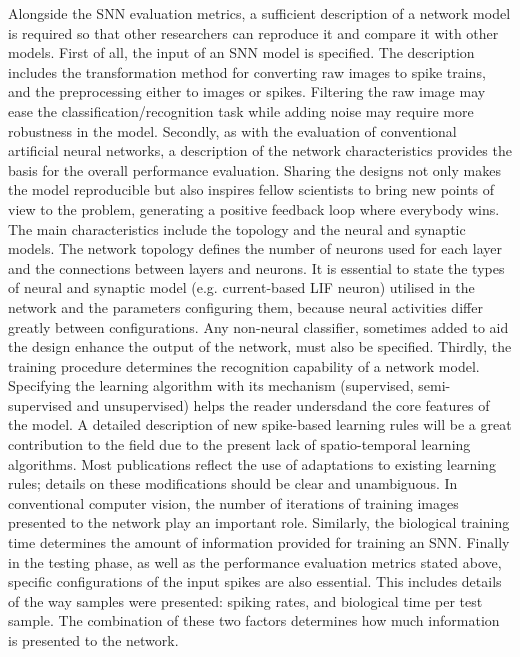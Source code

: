 Alongside the SNN evaluation metrics, a sufficient description of a network model is required so that other researchers can reproduce it and compare it with other models.
First of all, the input of an SNN model is specified.
The description includes the transformation method for converting raw images to spike trains, and the preprocessing either to images or spikes.
Filtering the raw image may ease the classification/recognition task while adding noise may require more robustness in the model.
Secondly, as with the evaluation of conventional artificial neural networks, a description of the network characteristics provides the basis for the overall performance evaluation.
Sharing the designs not only makes the model reproducible but also inspires fellow scientists to bring new points of view to the problem, generating a positive feedback loop where everybody wins.
The main characteristics include the topology and the neural and synaptic models.
The network topology defines the number of neurons used for each layer and the connections between layers and neurons.
It is essential to state the types of neural and synaptic model (e.g. current-based LIF neuron) utilised in the network and the parameters configuring them, because neural activities differ greatly between configurations.
Any non-neural classifier, sometimes added to aid the design enhance the output of the network, must also be specified.
Thirdly, the training procedure determines the recognition capability of a network model.
Specifying the learning algorithm with its mechanism (supervised, semi-supervised and unsupervised) helps the reader undersdand the core features of the model.
A detailed description of new spike-based learning rules will be a great contribution to the field due to the present lack of spatio-temporal learning algorithms.
Most publications reflect the use of adaptations to existing learning rules; details on these modifications should be clear and unambiguous.
In conventional computer vision, the number of iterations of training images presented to the network play an important role.
Similarly, the biological training time determines the amount of information provided for training an SNN.
Finally in the testing phase, as well as the performance evaluation metrics stated above, specific configurations of the input spikes are also essential.
This includes details of the way samples were presented: spiking rates, and biological time per test sample.
The combination of these two factors determines how much information is presented to the network.
